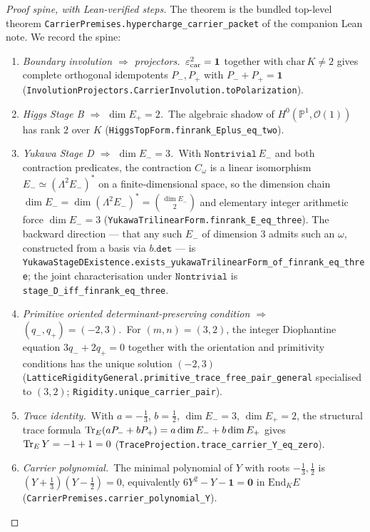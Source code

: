 \documentclass[11pt,a4paper]{article}
\begin{document}
\begin{proof}[Proof spine, with Lean-verified steps]
The theorem is the bundled top-level theorem
\texttt{CarrierPremises.hypercharge\_carrier\_packet} of the
companion Lean note. We record the spine:

\begin{enumerate}[label=(S\arabic*), leftmargin=2em, itemsep=2pt]
    \item \emph{Boundary involution $\Rightarrow$ projectors.}\
        $\varepsilon_{\mathrm{car}}^2 = \mathbf 1$ together with
        $\mathrm{char}\,K \ne 2$ gives complete orthogonal
        idempotents $P_-, P_+$ with $P_- + P_+ = \mathbf 1$
        (\texttt{InvolutionProjectors.CarrierInvolution.toPolarization}).
    \item \emph{Higgs Stage B $\Rightarrow$ $\dim E_+ = 2$.}\ The
        algebraic shadow of $H^0(\mathbb P^1, \mathcal O(1))$ has
        rank $2$ over $K$ (\texttt{HiggsTopForm.finrank\_Eplus\_eq\_two}).
    \item \emph{Yukawa Stage D $\Rightarrow$ $\dim E_- = 3$.}\ With
        $\texttt{Nontrivial}\,E_-$ and both contraction predicates,
        the contraction $C_\omega$ is a linear isomorphism
        $E_- \simeq (\Lambda^2 E_-)^*$ on a finite-dimensional space,
        so the dimension chain
        $\dim E_- = \dim(\Lambda^2 E_-)^* = \binom{\dim E_-}{2}$
        and elementary integer arithmetic force
        $\dim E_- = 3$
        (\texttt{YukawaTrilinearForm.finrank\_E\_eq\_three}).
        The backward direction --- that any such $E_-$ of dimension
        $3$ admits such an $\omega$, constructed from a basis via
        $b.\texttt{det}$ --- is
        \texttt{YukawaStageDExistence.exists\_yukawaTrilinearForm\_of\_finrank\_eq\_three};
        the joint characterisation under $\texttt{Nontrivial}$ is
        \texttt{stage\_D\_iff\_finrank\_eq\_three}.
    \item \emph{Primitive oriented determinant-preserving condition
        $\Rightarrow$ $(q_-, q_+) = (-2, 3)$.}\ For $(m, n) = (3, 2)$,
        the integer Diophantine equation
        $3 q_- + 2 q_+ = 0$ together with the orientation and
        primitivity conditions has the unique solution
        $(-2, 3)$
        (\texttt{LatticeRigidityGeneral.primitive\_trace\_free\_pair\_general}
        specialised to $(3, 2)$;
        \texttt{Rigidity.unique\_carrier\_pair}).
    \item \emph{Trace identity.}\ With $a = -\tfrac13$, $b = \tfrac12$,
        $\dim E_- = 3$, $\dim E_+ = 2$, the structural trace formula
        $\operatorname{Tr}_E (a P_- + b P_+) = a \dim E_- + b \dim E_+$ gives
        $\operatorname{Tr}_E Y = -1 + 1 = 0$
        (\texttt{TraceProjection.trace\_carrier\_Y\_eq\_zero}).
    \item \emph{Carrier polynomial.}\ The minimal polynomial of $Y$
        with roots $-\tfrac13, \tfrac12$ is
        $\left(Y + \tfrac13\right)\left(Y - \tfrac12\right) = 0$,
        equivalently $6 Y^2 - Y - \mathbf 1 = \mathbf 0$
        in $\mathrm{End}_K E$
        (\texttt{CarrierPremises.carrier\_polynomial\_Y}).
\end{enumerate}


\end{proof}
\end{document}
